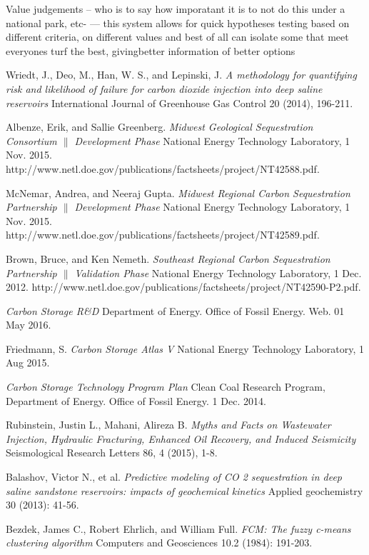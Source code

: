 \documentclass[letterpaper, 12pt]{article}
\begin{document}
Value judgements -- who is to say how imporatant it is to not do this under a national park, etc- --- this system allows for quick hypotheses testing based on different criteria, on different values and best of all can isolate some that meet everyones turf the best, givingbetter information of better options 
 
\begin{thebibliography}{9}

Wriedt, J., Deo, M., Han, W. S., and Lepinski, J.
\textit{A methodology for quantifying risk and likelihood of failure for carbon dioxide injection into deep saline reservoirs}
International Journal of Greenhouse Gas Control 20 (2014), 196-211.

Albenze, Erik, and Sallie Greenberg. 
\textit{Midwest Geological Sequestration Consortium $\|$ Development Phase}
National Energy Technology Laboratory, 1 Nov. 2015. http://www.netl.doe.gov/publications/factsheets/project/NT42588.pdf.

McNemar, Andrea, and Neeraj Gupta. 
\textit{Midwest Regional Carbon Sequestration Partnership $\|$ Development Phase}
National Energy Technology Laboratory, 1 Nov. 2015. http://www.netl.doe.gov/publications/factsheets/project/NT42589.pdf.

Brown, Bruce, and Ken Nemeth. 
\textit{Southeast Regional Carbon Sequestration Partnership $\|$ Validation Phase}
National Energy Technology Laboratory, 1 Dec. 2012. http://www.netl.doe.gov/publications/factsheets/project/NT42590-P2.pdf.

\textit{Carbon Storage R\&D} Department of Energy. Office of Fossil Energy. Web. 01 May 2016.

Friedmann, S. 
\textit{Carbon Storage Atlas V} 
National Energy Technology Laboratory, 1 Aug 2015.

\textit{Carbon Storage Technology Program Plan}
Clean Coal Research Program, Department of Energy. Office of Fossil Energy. 1 Dec. 2014.

Rubinstein, Justin L., Mahani, Alireza B.
\textit{Myths and Facts on Wastewater Injection, Hydraulic Fracturing, Enhanced Oil Recovery, and Induced Seismicity}
Seismological Research Letters 86, 4 (2015), 1-8. 

Balashov, Victor N., et al.
\textit{Predictive modeling of CO 2 sequestration in deep saline sandstone reservoirs: impacts of geochemical kinetics}
Applied geochemistry 30 (2013): 41-56.

Bezdek, James C., Robert Ehrlich, and William Full.
\textit{FCM: The fuzzy c-means clustering algorithm}
Computers and Geosciences 10.2 (1984): 191-203.

\end{thebibliography}
\end{document}
